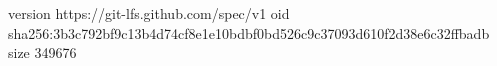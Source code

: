 version https://git-lfs.github.com/spec/v1
oid sha256:3b3c792bf9c13b4d74cf8e1e10bdbf0bd526c9c37093d610f2d38e6c32ffbadb
size 349676
